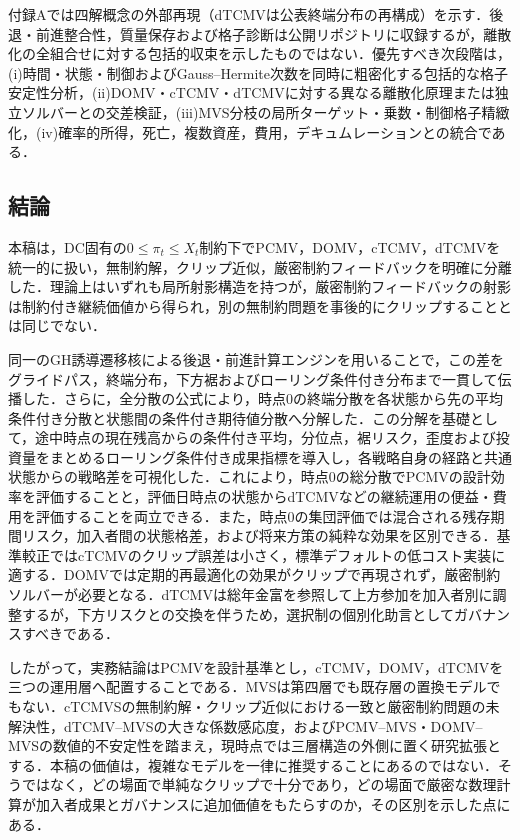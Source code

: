\documentclass[10pt,a4paper]{article}
\theoremstyle{plain}
\theoremstyle{definition}
\begin{document}
付録Aでは四解概念の外部再現（dTCMVは公表終端分布の再構成）を示す．後退・前進整合性，質量保存および格子診断は公開リポジトリに収録するが，離散化の全組合せに対する包括的収束を示したものではない．優先すべき次段階は，(i)時間・状態・制御およびGauss--Hermite次数を同時に粗密化する包括的な格子安定性分析，(ii)DOMV・cTCMV・dTCMVに対する異なる離散化原理または独立ソルバーとの交差検証，(iii)MVS分枝の局所ターゲット・乗数・制御格子精緻化，(iv)確率的所得，死亡，複数資産，費用，デキュムレーションとの統合である．

\subsection{結論}
本稿は，DC固有の$0\leq\pi_t\leq X_t$制約下でPCMV，DOMV，cTCMV，dTCMVを統一的に扱い，無制約解，クリップ近似，厳密制約フィードバックを明確に分離した．理論上はいずれも局所射影構造を持つが，厳密制約フィードバックの射影は制約付き継続価値から得られ，別の無制約問題を事後的にクリップすることとは同じでない．

同一のGH誘導遷移核による後退・前進計算エンジンを用いることで，この差をグライドパス，終端分布，下方裾およびローリング条件付き分布まで一貫して伝播した．さらに，全分散の公式により，時点0の終端分散を各状態から先の平均条件付き分散と状態間の条件付き期待値分散へ分解した．この分解を基礎として，途中時点の現在残高からの条件付き平均，分位点，裾リスク，歪度および投資量をまとめるローリング条件付き成果指標を導入し，各戦略自身の経路と共通状態からの戦略差を可視化した．これにより，時点0の総分散でPCMVの設計効率を評価することと，評価日時点の状態からdTCMVなどの継続運用の便益・費用を評価することを両立できる．また，時点0の集団評価では混合される残存期間リスク，加入者間の状態格差，および将来方策の純粋な効果を区別できる．基準較正ではcTCMVのクリップ誤差は小さく，標準デフォルトの低コスト実装に適する．DOMVでは定期的再最適化の効果がクリップで再現されず，厳密制約ソルバーが必要となる．dTCMVは総年金富を参照して上方参加を加入者別に調整するが，下方リスクとの交換を伴うため，選択制の個別化助言としてガバナンスすべきである．

したがって，実務結論はPCMVを設計基準とし，cTCMV，DOMV，dTCMVを三つの運用層へ配置することである．MVSは第四層でも既存層の置換モデルでもない．cTCMVSの無制約解・クリップ近似における一致と厳密制約問題の未解決性，dTCMV--MVSの大きな係数感応度，およびPCMV--MVS・DOMV--MVSの数値的不安定性を踏まえ，現時点では三層構造の外側に置く研究拡張とする．本稿の価値は，複雑なモデルを一律に推奨することにあるのではない．そうではなく，どの場面で単純なクリップで十分であり，どの場面で厳密な数理計算が加入者成果とガバナンスに追加価値をもたらすのか，その区別を示した点にある．
\end{document}
